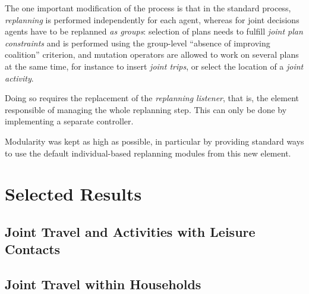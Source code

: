 {The one important modification of the process is that in the standard \matsim process,
\emph{replanning} is performed independently for each agent,
whereas for joint decisions agents have to be replanned \emph{as groups}:
selection of plans needs to fulfill \emph{joint plan constraints}
and is performed using the group-level ``absence of improving coalition''
criterion, and mutation operators are allowed to work on several plans at the same time,
for instance to insert \emph{joint trips}, or select the location of a
\emph{joint activity}.

Doing so requires the replacement of the \emph{replanning listener},
that is, the element responsible of managing the whole replanning step.
This can only be done by implementing a separate controller.

Modularity was kept as high as possible, in particular by providing standard ways
to use the default individual-based replanning modules from this new element.

\section{Selected Results\label{sec:td:results}}
\subsection{Joint Travel and Activities with Leisure Contacts}


\subsection{Joint Travel within Households}

}
